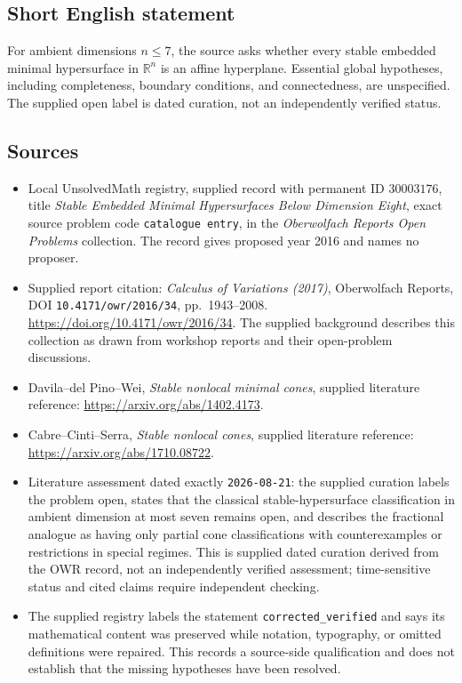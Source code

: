 \documentclass[11pt]{article}
\newcommand{\R}{\mathbb{R}}
\begin{document}
\subsection{Short English statement}
For ambient dimensions \(n\leq7\), the source asks whether every stable embedded minimal hypersurface in \(\R^n\) is an affine hyperplane. Essential global hypotheses, including completeness, boundary conditions, and connectedness, are unspecified. The supplied open label is dated curation, not an independently verified status.
\subsection{Sources}
\begin{itemize}
\item Local UnsolvedMath registry, supplied record with permanent ID \(30003176\), title \emph{Stable Embedded Minimal Hypersurfaces Below Dimension Eight}, exact source problem code \texttt{catalogue entry}, in the \emph{Oberwolfach Reports Open Problems} collection. The record gives proposed year 2016 and names no proposer.
\item Supplied report citation: \emph{Calculus of Variations (2017)}, Oberwolfach Reports, DOI \texttt{10.4171/owr/2016/34}, pp.\ 1943--2008. \url{https://doi.org/10.4171/owr/2016/34}. The supplied background describes this collection as drawn from workshop reports and their open-problem discussions.
\item Davila--del Pino--Wei, \emph{Stable nonlocal minimal cones}, supplied literature reference: \url{https://arxiv.org/abs/1402.4173}.
\item Cabre--Cinti--Serra, \emph{Stable nonlocal cones}, supplied literature reference: \url{https://arxiv.org/abs/1710.08722}.
\item Literature assessment dated exactly \texttt{2026-08-21}: the supplied curation labels the problem open, states that the classical stable-hypersurface classification in ambient dimension at most seven remains open, and describes the fractional analogue as having only partial cone classifications with counterexamples or restrictions in special regimes. This is supplied dated curation derived from the OWR record, not an independently verified assessment; time-sensitive status and cited claims require independent checking.
\item The supplied registry labels the statement \texttt{corrected\_verified} and says its mathematical content was preserved while notation, typography, or omitted definitions were repaired. This records a source-side qualification and does not establish that the missing hypotheses have been resolved.
\end{itemize}
\end{document}
